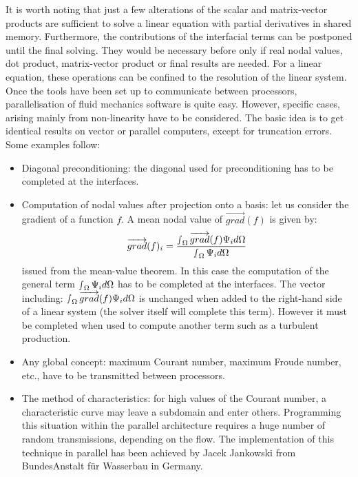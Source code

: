 It is worth noting that just a few alterations of the scalar and matrix-vector
products are sufficient to solve a linear equation with partial derivatives in
shared memory. Furthermore, the contributions of the interfacial terms can be
postponed until the final solving. They would be necessary before only if real
nodal values, dot product, matrix-vector product or final results are needed.
For a linear equation, these operations can be confined to the resolution of
the linear system. Once the tools have been set up to communicate between
processors, parallelisation of fluid mechanics software is quite easy. However,
specific cases, arising mainly from non-linearity have to be considered. The
basic idea is to get identical results on vector or parallel computers, except
for truncation errors. Some examples follow:
\begin{itemize}
  \item Diagonal preconditioning: the diagonal used for preconditioning has to
    be completed at the interfaces.
  \item Computation of nodal values after projection onto a basis: let us
    consider the gradient of a function $f$. A mean nodal value of
    $\overrightarrow{grad} (f)$  is given by:
    \[\overrightarrow{grad} (f)_{i} =
      \frac{\mathop{\smallint}\nolimits_{\Omega } \overrightarrow{grad} (f)\Psi _{i}
d\Omega }{\mathop{\smallint }\nolimits_{\Omega } \Psi _{i}  d\Omega } \]
issued from the mean-value theorem. In this case the computation of the general
term  $\mathop{\smallint }\nolimits_{\Omega } \Psi _{i}  d\Omega $  has to be
completed at the interfaces. The vector including: $\mathop{\smallint
}\nolimits_{\Omega } \overrightarrow{grad} (f)\Psi _{i}
d\Omega $ is unchanged when added to the right-hand side of a linear system
(the solver itself will complete this term). However it must be completed when
used to compute another term such as a turbulent production.
  \item Any global concept: maximum Courant number, maximum Froude number,
    etc., have to be transmitted between processors.

  \item The method of characteristics: for high values of the Courant number, a
    characteristic curve may leave a subdomain and enter others. Programming
    this situation within the parallel architecture requires a huge number of
    random transmissions, depending on the flow. The implementation of this
    technique in parallel has been achieved by Jacek Jankowski from
    BundesAnstalt f\"{u}r Wasserbau in Germany.
\end{itemize}

